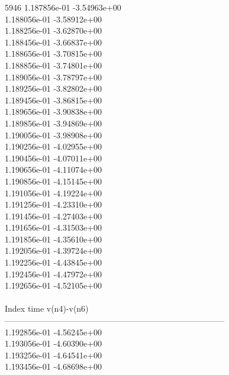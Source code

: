 5946	1.187856e-01	-3.54963e+00	\\ 	1.188056e-01	-3.58912e+00	\\ 	1.188256e-01	-3.62870e+00	\\ 	1.188456e-01	-3.66837e+00	\\ 	1.188656e-01	-3.70815e+00	\\ 	1.188856e-01	-3.74801e+00	\\ 	1.189056e-01	-3.78797e+00	\\ 	1.189256e-01	-3.82802e+00	\\ 	1.189456e-01	-3.86815e+00	\\ 	1.189656e-01	-3.90838e+00	\\ 	1.189856e-01	-3.94869e+00	\\ 	1.190056e-01	-3.98908e+00	\\ 	1.190256e-01	-4.02955e+00	\\ 	1.190456e-01	-4.07011e+00	\\ 	1.190656e-01	-4.11074e+00	\\ 	1.190856e-01	-4.15145e+00	\\ 	1.191056e-01	-4.19224e+00	\\ 	1.191256e-01	-4.23310e+00	\\ 	1.191456e-01	-4.27403e+00	\\ 	1.191656e-01	-4.31503e+00	\\ 	1.191856e-01	-4.35610e+00	\\ 	1.192056e-01	-4.39724e+00	\\ 	1.192256e-01	-4.43845e+00	\\ 	1.192456e-01	-4.47972e+00	\\ 	1.192656e-01	-4.52105e+00	\\ \hline
\\ \hline
Index   time            v(n4)-v(n6)     \\ \hline
--------------------------------------------------------------------------------\\ 	1.192856e-01	-4.56245e+00	\\ 	1.193056e-01	-4.60390e+00	\\ 	1.193256e-01	-4.64541e+00	\\ 	1.193456e-01	-4.68698e+00	\\ \hline
